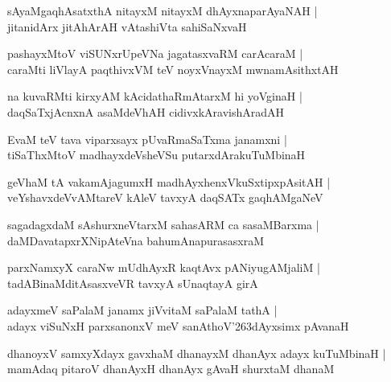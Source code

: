 \documentclass[twoside,12pt,openright]{book}
\def\S{\char'263}
\newcounter{shloka}[chapter]
\begin{document}
\begin{shloka}
sAyaMgaqhAsatxthA nitayxM nitayxM dhAyxnaparAyaNAH |\\
jitanidArx jitAhArAH vAtashiVta sahiSaNxvaH 
\end{shloka}

\begin{shloka}
pashayxMtoV viSUNxrUpeVNa jagatasxvaRM carAcaraM |\\
caraMti liVlayA paqthivxVM teV noyxVnayxM mwnamAsithxtAH 
\end{shloka}

\begin{shloka}
na kuvaRMti kirxyAM kAcidathaRmAtarxM hi yoVginaH |\\
daqSaTxjAcnxnA asaMdeVhAH cidivxkAravishAradAH 
\end{shloka}

\begin{shloka}
EvaM teV tava viparxsayx pUvaRmaSaTxma janamxni |\\
tiSaThxMtoV madhayxdeVsheVSu putarxdArakuTuMbinaH 
\end{shloka}

\begin{shloka}
geVhaM tA vakamAjagumxH madhAyxhenxVkuSxtipxpAsitAH |\\
veYshavxdeVvAMtareV kAleV tavxyA daqSATx gaqhAMgaNeV 
\end{shloka}

\begin{shloka}
sagadagxdaM sAshurxneVtarxM sahasARM ca sasaMBarxma |\\
daMDavatapxrXNipAteVna bahumAnapurasasxraM 
\end{shloka}

\begin{shloka}
parxNamxyX caraNw mUdhAyxR kaqtAvx pANiyugAMjaliM |\\
tadABinaMditAsasxveVR tavxyA sUnaqtayA girA
\end{shloka}

\begin{shloka}
adayxmeV saPalaM janamx jiVvitaM saPalaM tathA |\\
adayx viSuNxH parxsanonxV meV sanAthoV\S dAyxsimx pAvanaH 
\end{shloka}

\begin{shloka}
dhanoyxV samxyXdayx gavxhaM dhanayxM dhanAyx adayx kuTuMbinaH |\\
mamAdaq pitaroV dhanAyxH dhanAyx gAvaH shurxtaM dhanaM 
\end{shloka}
\end{document}
